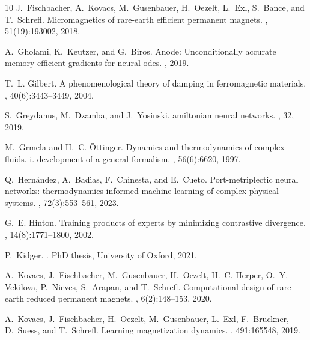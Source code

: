 \documentclass[a4paper,11pt]{article}
\begin{document}
\begin{table}[ht]
\begin{table}[ht]
\begin{thebibliography}{10}
J.~Fischbacher, A.~Kovacs, M.~Gusenbauer, H.~Oezelt, L.~Exl, S.~Bance, and T.~Schrefl.
\newblock Micromagnetics of rare-earth efficient permanent magnets.
, 51(19):193002, 2018.

A.~Gholami, K.~Keutzer, and G.~Biros.
\newblock Anode: Unconditionally accurate memory-efficient gradients for neural odes.
, 2019.

T.~L. Gilbert.
\newblock A phenomenological theory of damping in ferromagnetic materials.
, 40(6):3443--3449, 2004.

S.~Greydanus, M.~Dzamba, and J.~Yosinski.
amiltonian neural networks.
, 32, 2019.

M.~Grmela and H.~C. {\"O}ttinger.
\newblock Dynamics and thermodynamics of complex fluids. i. development of a general formalism.
, 56(6):6620, 1997.

Q.~Hern{\'a}ndez, A.~Bad{\'\i}as, F.~Chinesta, and E.~Cueto.
\newblock Port-metriplectic neural networks: thermodynamics-informed machine learning of complex physical systems.
, 72(3):553--561, 2023.

G.~E. Hinton.
\newblock Training products of experts by minimizing contrastive divergence.
, 14(8):1771--1800, 2002.

P.~Kidger.
.
\newblock PhD thesis, University of Oxford, 2021.

A.~Kovacs, J.~Fischbacher, M.~Gusenbauer, H.~Oezelt, H.~C. Herper, O.~Y. Vekilova, P.~Nieves, S.~Arapan, and T.~Schrefl.
\newblock Computational design of rare-earth reduced permanent magnets.
, 6(2):148--153, 2020.

A.~Kovacs, J.~Fischbacher, H.~Oezelt, M.~Gusenbauer, L.~Exl, F.~Bruckner, D.~Suess, and T.~Schrefl.
\newblock Learning magnetization dynamics.
, 491:165548, 2019.


\end{thebibliography}
\end{table}
\end{table}
\end{document}
